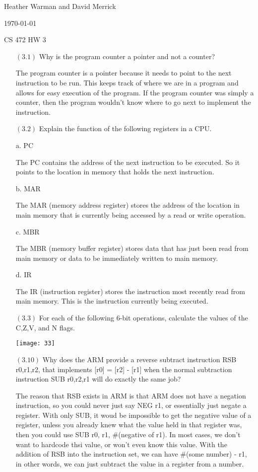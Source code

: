 \documentclass[letterpaper,10pt,titlepage]{article}
\def\name{Heather Warman and David Merrick}
\begin{document}
\hfill \name

\hfill \today

\hfill CS 472 HW 3

\begin{enumerate}
\item[$(3.1)$] Why is the program counter a pointer and not a counter?

The program counter is a pointer because it needs to point to the next instruction to be run. This keeps track of where we are in a program and allows for easy execution of the program. If the program counter was simply a counter, then the program wouldn't know where to go next to implement the instruction.


\item[$(3.2)$] Explain the function of the following registers in a CPU.

a. PC

The PC contains the address of the next instruction to be executed. So it points to the location in memory that holds the next instruction.

b. MAR

The MAR (memory address register) stores the address of the location in main memory that is currently being accessed by a read or write operation.

c. MBR

The MBR (memory buffer register) stores data that has just been read from main memory or data to be immediately written to main memory.

d. IR

The IR (instruction register) stores the instruction most recently read from main memory. This is the instruction currently being executed.


\item[$(3.3)$] For each of the following 6-bit operations, calculate the values of the C,Z,V, and N flags.

\begin{center}
\texttt{[image: 33]}
\end{center}

\item[$(3.10)$] Why does the ARM provide a reverse subtract instruction RSB r0,r1,r2, that implements [r0] = [r2] - [r1] when the normal subtraction instruction SUB r0,r2,r1 will do exactly the same job?

The reason that RSB exists in ARM is that ARM does not have a negation instruction, so you could never just say NEG r1, or essentially just negate a register. With only SUB, it woud be impossible to get the negative value of a register, unless you already knew what the value held in that register was, then you could use SUB r0, r1, \#(negative of r1). In most cases, we don't want to hardcode thsi value, or won't even know this value. With the addition of RSB into the instruction set, we can have \#(some number) - r1, in other words, we can just subtract the value in a register from a number.



\end{enumerate}
\end{document}
